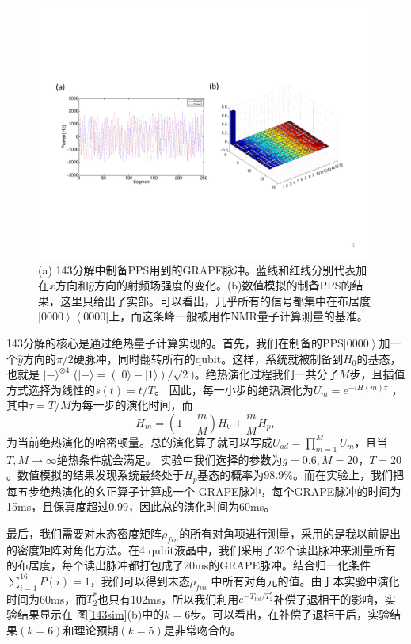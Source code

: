 \begin{figure}[htbp]
            \begin{center}
              \includegraphics[width= 0.8\columnwidth]{figures/143pps.pdf}
              \caption{(a) 143分解中制备PPS用到的GRAPE脉冲。蓝线和红线分别代表加在$\hat{x}$方向和$\hat{y}$方向的射频场强度的变化。(b)数值模拟的制备PPS的结果，这里只给出了实部。可以看出，几乎所有的信号都集中在布居度$\left\vert 0000 \right\rangle \left\langle 0000 \right\vert$上，而这条峰一般被用作NMR量子计算测量的基准。}
              \label{143pps}
            \end{center}
\end{figure}

143分解的核心是通过绝热量子计算实现的。首先，我们在制备的PPS$\left\vert 0000 \right\rangle$加一个$\hat{y}$方向的$\pi/2$硬脉冲，同时翻转所有的qubit。这样，系统就被制备到$H_0$的基态，也就是
$|-\rangle^{\otimes4}$
($|-\rangle=(|0\rangle-|1\rangle)/\sqrt{2}$)。绝热演化过程我们一共分了$M$步\cite{aqc4,aqc5}，且插值方式选择为线性的$s(t)=t/T$。
因此，每一小步的绝热演化为$U_{m}=e^{-iH(m)\tau }$ ，其中$\tau=T/M$为每一步的演化时间，而
\begin{equation}\label{aaa}
H_m =(1-\frac{m}{M})H_0+\frac{m}{M}H_p,
\end{equation}
为当前绝热演化的哈密顿量。总的演化算子就可以写成$U_{ad}=\prod_{m=1}^{M}U_{m}$，且当$T,M\rightarrow\infty$绝热条件就会满足。
实验中我们选择的参数为$g=0.6,
M=20$，$T=20$。数值模拟的结果发现系统最终处于$H_p$基态的概率为$98.9\%$。而在实验上，我们把每五步绝热演化的幺正算子计算成一个
GRAPE脉冲，每个GRAPE脉冲的时间为15ms，且保真度超过0.99，因此总的演化时间为60ms。

最后，我们需要对末态密度矩阵$\rho_{fin}$的所有对角项进行测量，采用的是我以前提出的密度矩阵对角化方法\cite{rw1}。在4 qubit液晶中，我们采用了32个读出脉冲来测量所有的布居度，每个读出脉冲都打包成了20ms的GRAPE脉冲。结合归一化条件$\sum_{i=1}^{16}P(i)=1$，我们可以得到末态$\rho_{fin}$
中所有对角元的值。由于本实验中演化时间为60ms，而$T_2^{*}$也只有102ms，所以我们利用$e^{-T_{tot}/T_2^{*}}$补偿了退相干的影响，实验结果显示在
图\ref{143sim}(b)中的$k=6$步。可以看出，在补偿了退相干后，实验结果$(k=6)$和理论预期$(k=5)$是非常吻合的。

